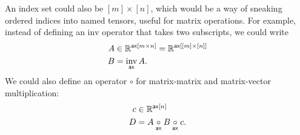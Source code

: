 An index set could also be $[m] \times [n]$, which would be a way of sneaking ordered indices into named tensors, useful for matrix operations. For example, instead of defining an $\text{inv}$ operator that takes two subscripts, we could write
\begin{align*}
  A &\in \mathbb{R}^{\nset{ax}{{m\times n}}} = \mathbb{R}^{\nset{ax}{{[m]\times [n]}}} \\
  B &= \nfun{ax}{inv} A.
\end{align*}
We could also define an operator $\circ$ for matrix-matrix and matrix-vector multiplication:
\begin{align*}
  c &\in \mathbb{R}^{\nset{ax}{n}} \\
  D &= A \nbin{ax}{\circ} B \nbin{ax}{\circ} c.
\end{align*}
